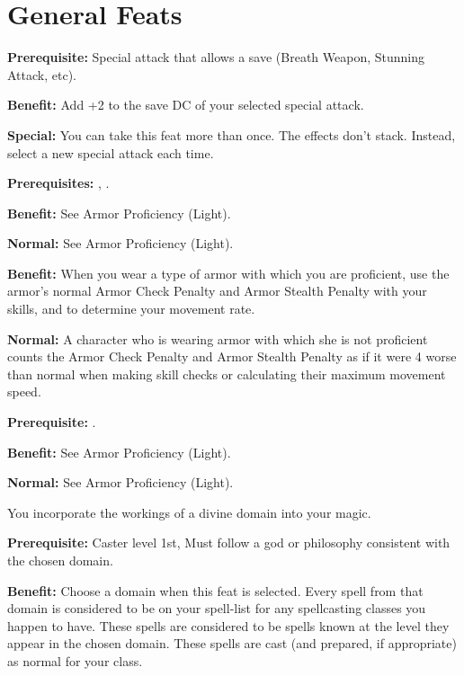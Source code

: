 \section{General Feats}


\textbf{Prerequisite:} Special attack that allows a save (Breath Weapon, Stunning Attack, etc).

\textbf{Benefit:} Add +2 to the save DC of your selected special attack.

\textbf{Special:} You can take this feat more than once. The effects don't stack. Instead, select a new special attack each time.


\textbf{Prerequisites:} , .

\textbf{Benefit:} See Armor Proficiency (Light).

\textbf{Normal:} See Armor Proficiency (Light).


\textbf{Benefit:} When you wear a type of armor with which you are proficient, use the armor's normal Armor Check Penalty and Armor Stealth Penalty with your skills, and to determine your movement rate.

\textbf{Normal:} A character who is wearing armor with which she is not proficient counts the Armor Check Penalty and Armor Stealth Penalty as if it were 4 worse than normal when making skill checks or calculating their maximum movement speed.


\textbf{Prerequisite:} .

\textbf{Benefit:} See Armor Proficiency (Light).

\textbf{Normal:} See Armor Proficiency (Light).


You incorporate the workings of a divine domain into your magic.

\textbf{Prerequisite:} Caster level 1st, Must follow a god or philosophy consistent with the chosen domain.

\textbf{Benefit:} Choose a domain when this feat is selected. Every spell from that domain is considered to be on your spell-list for any spellcasting classes you happen to have. These spells are considered to be spells known at the level they appear in the chosen domain. These spells are cast (and prepared, if appropriate) as normal for your class.

